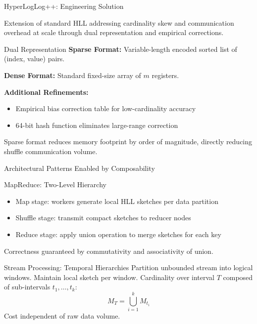 \documentclass{beamer}
\begin{document}
\begin{frame}{HyperLogLog++: Engineering Solution}

    \begin{definition}[HyperLogLog++]
        Extension of standard HLL addressing cardinality skew and communication overhead at scale through dual representation and empirical corrections.
    \end{definition}

    \begin{block}{Dual Representation}
        \textbf{Sparse Format:} Variable-length encoded sorted list of (index, value) pairs.

        \textbf{Dense Format:} Standard fixed-size array of $m$ registers.

    \end{block}

    \textbf{Additional Refinements:}
    \begin{itemize}
        \item Empirical bias correction table for low-cardinality accuracy
        \item 64-bit hash function eliminates large-range correction
    \end{itemize}

    Sparse format reduces memory footprint by order of magnitude, directly reducing shuffle communication volume.

\end{frame}

\begin{frame}{Architectural Patterns Enabled by Composability}

    \begin{block}{MapReduce: Two-Level Hierarchy}
        \begin{itemize}
            \item Map stage: workers generate local HLL sketches per data partition
            \item Shuffle stage: transmit compact sketches to reducer nodes
            \item Reduce stage: apply union operation to merge sketches for each key
        \end{itemize}
        Correctness guaranteed by commutativity and associativity of union.
    \end{block}

    \begin{block}{Stream Processing: Temporal Hierarchies}
        Partition unbounded stream into logical windows. Maintain local sketch per window. Cardinality over interval $T$ composed of sub-intervals $t_1, \ldots, t_k$:
        $$M_T = \bigcup_{i=1}^{k} M_{t_i}$$
        Cost independent of raw data volume.
    \end{block}

\end{frame}
\end{document}
